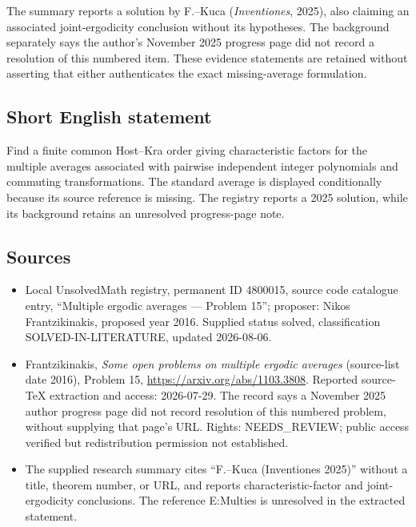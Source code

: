 \documentclass[11pt]{article}
\begin{document}
The summary reports a solution by F.--Kuca (\emph{Inventiones}, 2025), also claiming an associated joint-ergodicity conclusion without its hypotheses. The background separately says the author's November 2025 progress page did not record a resolution of this numbered item. These evidence statements are retained without asserting that either authenticates the exact missing-average formulation.
\subsection{Short English statement}
Find a finite common Host--Kra order giving characteristic factors for the multiple averages associated with pairwise independent integer polynomials and commuting transformations. The standard average is displayed conditionally because its source reference is missing. The registry reports a 2025 solution, while its background retains an unresolved progress-page note.
\subsection{Sources}
\begin{itemize}
\item Local UnsolvedMath registry, permanent ID 4800015, source code catalogue entry, ``Multiple ergodic averages --- Problem 15''; proposer: Nikos Frantzikinakis, proposed year 2016. Supplied status solved, classification SOLVED-IN-LITERATURE, updated 2026-08-06.
\item Frantzikinakis, \emph{Some open problems on multiple ergodic averages} (source-list date 2016), Problem 15, \url{https://arxiv.org/abs/1103.3808}. Reported source-TeX extraction and access: 2026-07-29. The record says a November 2025 author progress page did not record resolution of this numbered problem, without supplying that page's URL. Rights: NEEDS\_REVIEW; public access verified but redistribution permission not established.
\item The supplied research summary cites ``F.--Kuca (Inventiones 2025)'' without a title, theorem number, or URL, and reports characteristic-factor and joint-ergodicity conclusions. The reference E:Multies is unresolved in the extracted statement.
\end{itemize}
\end{document}
